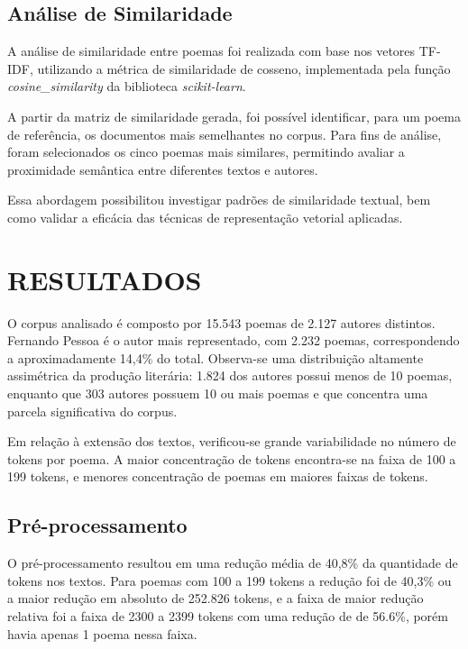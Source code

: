 \documentclass[
	article,
	12pt,
	oneside,
	a4paper,
	english,
	brazil,
	sumario=tradicional
]{abntex2}
\begin{document}
\subsection{Análise de Similaridade}

A análise de similaridade entre poemas foi realizada com base nos vetores TF-IDF, utilizando a métrica de similaridade de cosseno, implementada pela função \textit{cosine\_similarity} da biblioteca \textit{scikit-learn}.

A partir da matriz de similaridade gerada, foi possível identificar, para um poema de referência, os documentos mais semelhantes no corpus. Para fins de análise, foram selecionados os cinco poemas mais similares, permitindo avaliar a proximidade semântica entre diferentes textos e autores.

Essa abordagem possibilitou investigar padrões de similaridade textual, bem como validar a eficácia das técnicas de representação vetorial aplicadas.

\section{\textbf{RESULTADOS}}
\label{sec:resultados}

O corpus analisado é composto por 15.543 poemas de 2.127 autores distintos. Fernando Pessoa é o autor mais representado, com 2.232 poemas, correspondendo a aproximadamente 14,4\% do total. Observa-se uma distribuição altamente assimétrica da produção literária: 1.824 dos autores possui menos de 10 poemas, enquanto que 303 autores possuem 10 ou mais poemas e que concentra uma parcela significativa do corpus.

Em relação à extensão dos textos, verificou-se grande variabilidade no número de tokens por poema. A maior concentração de tokens encontra-se na faixa de 100 a 199 tokens, e menores concentração de poemas em maiores faixas de tokens.

\subsection{Pré-processamento}

O pré-processamento resultou em uma redução média de 40,8\% da quantidade de tokens nos textos. Para poemas com 100 a 199 tokens a redução foi de 40,3\%  ou a maior redução em absoluto de 252.826 tokens, e a faixa de maior redução relativa foi a faixa de 2300 a 2399 tokens com uma redução de de 56.6\%, porém havia apenas 1 poema nessa faixa.
\end{document}
